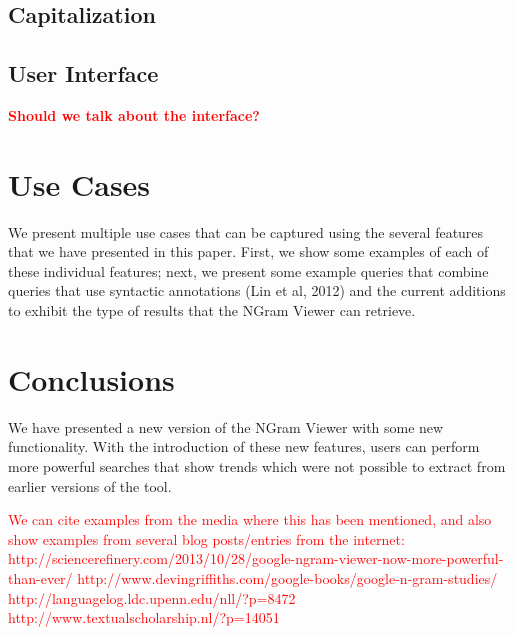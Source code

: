 \documentclass[11pt]{article}
\begin{document}
\subsection{Capitalization}

\subsection{User Interface}
\textcolor{red}{\bf Should we talk about the interface?}


\section{Use Cases}
\label{sec:usecases}
We present multiple use cases that can be captured using the several features that we have presented in this paper. First, we show some examples of each of these individual features; next, we present some example queries that combine queries that use syntactic annotations (Lin et al, 2012) and the current additions to exhibit the type of results that the NGram Viewer can retrieve.


\section{Conclusions}
We have presented a new version of the NGram Viewer with some new functionality. With the introduction of these new features, users can perform more powerful searches that show trends which were not possible to extract from earlier versions of the tool. 

\textcolor{red}{We can cite examples from the media where this has been mentioned, and also show examples from several blog posts/entries from the internet:
http://sciencerefinery.com/2013/10/28/google-ngram-viewer-now-more-powerful-than-ever/
http://www.devingriffiths.com/google-books/google-n-gram-studies/
http://languagelog.ldc.upenn.edu/nll/?p=8472
http://www.textualscholarship.nl/?p=14051}





\end{document}
